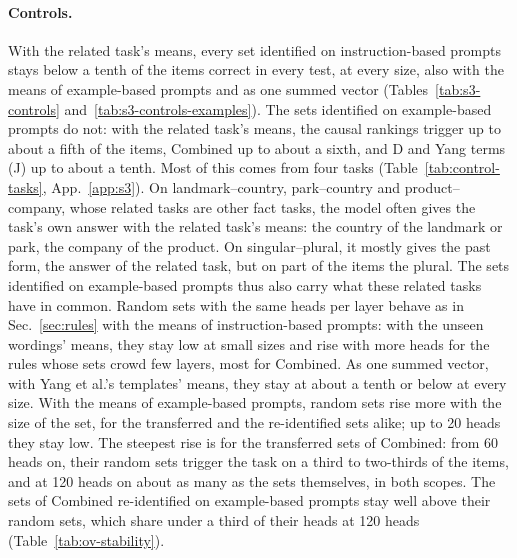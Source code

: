 \documentclass[10pt,a4paper]{article}
\begin{document}
\begin{table}[tbp]
\centering\footnotesize\setlength{\tabcolsep}{4pt}

\caption{Accuracy of every rule re-identified on example-based prompts, patched head by head (heads; Table~\ref{tab:examples}) and as one summed vector (sum), with the means of the three test formats (Fig.~\ref{fig:summed-examples}). --: the rule does not fill the size on every task. Random sets and control means are in Table~\ref{tab:s3-controls-examples}.}
\label{tab:summed-examples}
\end{table}

\paragraph{Controls.} With the related task's means, every set identified on instruction-based prompts stays below a tenth of the items correct in every test, at every size, also with the means of example-based prompts and as one summed vector (Tables~\ref{tab:s3-controls} and~\ref{tab:s3-controls-examples}). The sets identified on example-based prompts do not: with the related task's means, the causal rankings trigger up to about a fifth of the items, Combined up to about a sixth, and D and Yang terms (J) up to about a tenth. Most of this comes from four tasks (Table~\ref{tab:control-tasks}, App.~\ref{app:s3}). On landmark--country, park--country and product--company, whose related tasks are other fact tasks, the model often gives the task's own answer with the related task's means: the country of the landmark or park, the company of the product. On singular--plural, it mostly gives the past form, the answer of the related task, but on part of the items the plural. The sets identified on example-based prompts thus also carry what these related tasks have in common. Random sets with the same heads per layer behave as in Sec.~\ref{sec:rules} with the means of instruction-based prompts: with the unseen wordings' means, they stay low at small sizes and rise with more heads for the rules whose sets crowd few layers, most for Combined. As one summed vector, with Yang et al.'s templates' means, they stay at about a tenth or below at every size. With the means of example-based prompts, random sets rise more with the size of the set, for the transferred and the re-identified sets alike; up to 20 heads they stay low. The steepest rise is for the transferred sets of Combined: from 60 heads on, their random sets trigger the task on a third to two-thirds of the items, and at 120 heads on about as many as the sets themselves, in both scopes. The sets of Combined re-identified on example-based prompts stay well above their random sets, which share under a third of their heads at 120 heads (Table~\ref{tab:ov-stability}).
\end{document}
